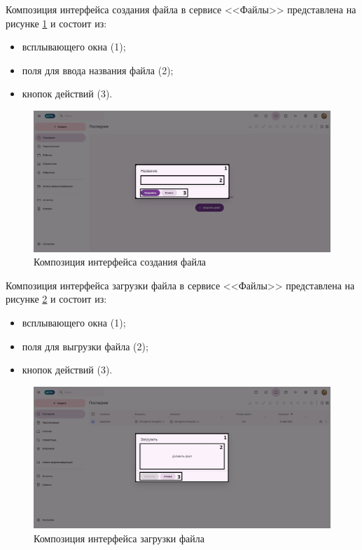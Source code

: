 Композиция интерфейса создания файла в сервисе <<Файлы>> представлена на рисунке \ref{templ:image9b} и состоит из:
\begin{itemize}
  \item всплывающего окна (1);
  \item поля для ввода названия файла (2);
  \item кнопок действий (3).
\end{itemize}
\begin{figure}[H]
	\centering
	\includegraphics[width=1\linewidth]{images/файлы2}
	\caption{Композиция интерфейса создания файла}
	\label{templ:image9b}
\end{figure}

Композиция интерфейса загрузки файла в сервисе <<Файлы>> представлена на рисунке \ref{templ:image9c} и состоит из:
\begin{itemize}
  \item всплывающего окна (1);
  \item поля для выгрузки файла (2);
  \item кнопок действий (3).
\end{itemize}
\begin{figure}[H]
	\centering
	\includegraphics[width=1\linewidth]{images/файлы3}
	\caption{Композиция интерфейса загрузки файла}
	\label{templ:image9c}
\end{figure}

